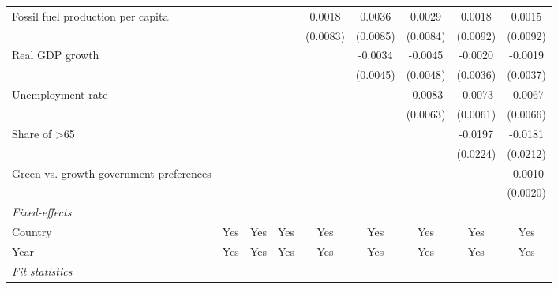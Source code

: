 \begin{table}[htbp]
\begin{tabular}{lcccccccc}
      Fossil fuel production per capita         &          &          &               & 0.0018        & 0.0036        & 0.0029        & 0.0018        & 0.0015\\   
                                                &          &          &               & (0.0083)      & (0.0085)      & (0.0084)      & (0.0092)      & (0.0092)\\   
      Real GDP growth                           &          &          &               &               & -0.0034       & -0.0045       & -0.0020       & -0.0019\\   
                                                &          &          &               &               & (0.0045)      & (0.0048)      & (0.0036)      & (0.0037)\\   
      Unemployment rate                         &          &          &               &               &               & -0.0083       & -0.0073       & -0.0067\\   
                                                &          &          &               &               &               & (0.0063)      & (0.0061)      & (0.0066)\\   
      Share of >65                              &          &          &               &               &               &               & -0.0197       & -0.0181\\   
                                                &          &          &               &               &               &               & (0.0224)      & (0.0212)\\   
      Green vs. growth government preferences   &          &          &               &               &               &               &               & -0.0010\\   
                                                &          &          &               &               &               &               &               & (0.0020)\\   
      \midrule
      \emph{Fixed-effects}\\
      Country                                   & Yes      & Yes      & Yes           & Yes           & Yes           & Yes           & Yes           & Yes\\  
      Year                                      & Yes      & Yes      & Yes           & Yes           & Yes           & Yes           & Yes           & Yes\\  
      \midrule
      \emph{Fit statistics}\\

\end{tabular}
\end{table}
